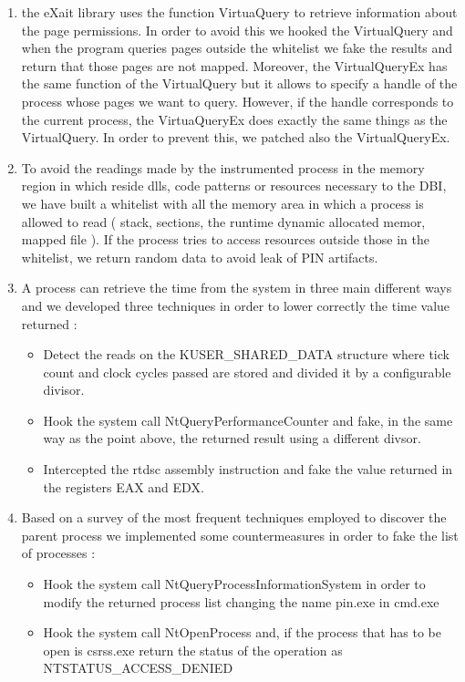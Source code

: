 \begin{enumerate}
\item the eXait library uses the function VirtuaQuery to retrieve information about the page permissions. In order to avoid this we hooked the VirtualQuery and when the program queries pages outside the whitelist we fake the results and return that those pages are not mapped. Moreover, the VirtualQueryEx has the same function of the VirtualQuery but it allows to specify a handle of the process whose pages we want to query. However, if the handle corresponds to the current process, the VirtuaQueryEx does exactly the same things as the VirtualQuery. In order to prevent this, we patched also the VirtualQueryEx.

\item To avoid the readings made by the instrumented process in the memory region in which reside dlls, code patterns or resources necessary to the DBI, we have built a whitelist with all the memory area in which a process is allowed to read ( stack, sections, the runtime dynamic allocated memor, mapped file ). If the process tries to access resources outside those in the whitelist, we return random data to avoid leak of PIN artifacts.

\item A process can retrieve the time from the system in three main different ways and we developed three techniques in order to lower correctly the time value returned :

\begin{itemize}
\item Detect the reads on the KUSER\_SHARED\_DATA structure where tick count and clock cycles passed are stored and divided it by a configurable divisor.

\item Hook the system call NtQueryPerformanceCounter and fake, in the same way as the point above, the returned result using a different divsor.

\item Intercepted the rtdsc assembly instruction and fake the value returned in the registers EAX and EDX.
\end{itemize}

\item Based on a survey\cite{Controlling-Windows-process-list} of the most frequent techniques employed to discover the parent process we implemented some countermeasures in order to fake the list of processes :

\begin{itemize}
\item Hook the system call NtQueryProcessInformationSystem in order to modify the returned process list changing the name pin.exe in cmd.exe

\item Hook the system call NtOpenProcess and, if the process that has to be open is csrss.exe return the status of the operation as NTSTATUS\_ACCESS\_DENIED
\end{itemize}

\end{enumerate}

